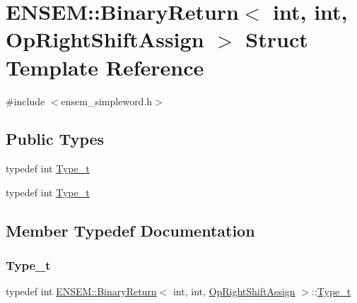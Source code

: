 \hypertarget{structENSEM_1_1BinaryReturn_3_01int_00_01int_00_01OpRightShiftAssign_01_4}{}\section{E\+N\+S\+EM\+:\+:Binary\+Return$<$ int, int, Op\+Right\+Shift\+Assign $>$ Struct Template Reference}
\label{structENSEM_1_1BinaryReturn_3_01int_00_01int_00_01OpRightShiftAssign_01_4}


{\ttfamily \#include $<$ensem\+\_\+simpleword.\+h$>$}

\subsection*{Public Types}
\begin{DoxyCompactItemize}
\item 
typedef int \mbox{\hyperlink{structENSEM_1_1BinaryReturn_3_01int_00_01int_00_01OpRightShiftAssign_01_4_aee34dbba921ba57b3f70c5f4d289e88d}{Type\+\_\+t}}
\item 
typedef int \mbox{\hyperlink{structENSEM_1_1BinaryReturn_3_01int_00_01int_00_01OpRightShiftAssign_01_4_aee34dbba921ba57b3f70c5f4d289e88d}{Type\+\_\+t}}
\end{DoxyCompactItemize}


\subsection{Member Typedef Documentation}
\mbox{\label{structENSEM_1_1BinaryReturn_3_01int_00_01int_00_01OpRightShiftAssign_01_4_aee34dbba921ba57b3f70c5f4d289e88d}} 
\subsubsection{\texorpdfstring{Type\_t}{Type\_t}\hspace{0.1cm}{\footnotesize\ttfamily [1/2]}}
{\footnotesize\ttfamily typedef int \mbox{\hyperlink{structENSEM_1_1BinaryReturn}{E\+N\+S\+E\+M\+::\+Binary\+Return}}$<$ int, int, \mbox{\hyperlink{structENSEM_1_1OpRightShiftAssign}{Op\+Right\+Shift\+Assign}} $>$\+::\mbox{\hyperlink{structENSEM_1_1BinaryReturn_3_01int_00_01int_00_01OpRightShiftAssign_01_4_aee34dbba921ba57b3f70c5f4d289e88d}{Type\+\_\+t}}}

